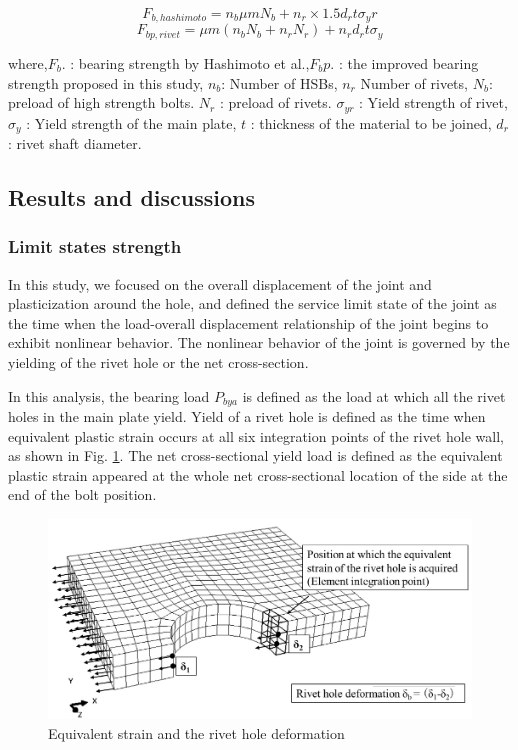 \begin{equation}\label{eq-fbhashi}
    F_{b,hashimoto}=n_b μmN_b + n_r \times 1.5d_r tσ_yr
\end{equation}
\begin{equation} \label{eq-fbp}
    F_{bp,rivet}=μm(n_b N_b+n_r N_r)+n_r d_r tσ_y
\end{equation}

where,$F_b.$ : bearing strength by Hashimoto et al.,$F_bp$. : the improved bearing strength proposed in this study, $n_b$: Number of \ac{HSB}s, $n_r$ Number of rivets, $N_b$: preload of high strength bolts. $N_r$ : preload of rivets. $\sigma_{yr}$ : Yield strength of rivet, $σ_y$ : Yield strength of the main plate, $t$ : thickness of the material to be joined, $d_r$: rivet shaft diameter.

\subsection{Results and discussions}

\subsubsection{Limit states strength}

In this study, we focused on the overall displacement of the joint and plasticization around the hole, and defined the service limit state of the joint as the time when the load-overall displacement relationship of the joint begins to exhibit nonlinear behavior. The nonlinear behavior of the joint is governed by the yielding of the rivet hole or the net cross-section.

In this analysis, the bearing load $P_{bya}$ is defined as the load at which all the rivet holes in the main plate yield. Yield of a rivet hole is defined as the time when equivalent plastic strain occurs at all six integration points of the rivet hole wall, as shown in Fig. \ref{fig-posieqqe}. \ac{The net cross-sectional yield load} is defined as the equivalent plastic strain appeared at the whole net cross-sectional location of the side at the end of the bolt position.

\begin{figure}[htbp]
    \centering
    \includegraphics[width=0.75\linewidth]{imgs//ch4/posi-eqqe.pdf}
    \caption{Equivalent strain and the rivet hole deformation}
    \label{fig-posieqqe}
\end{figure}

